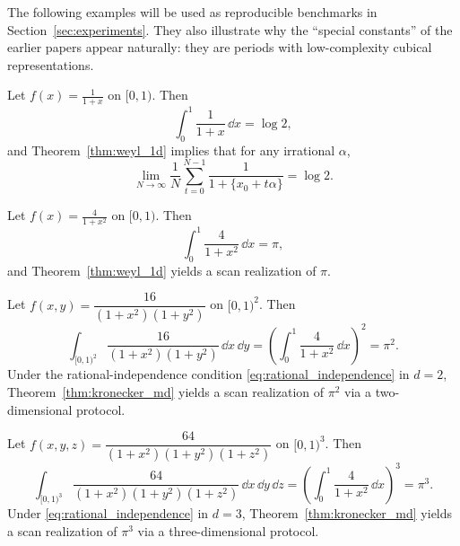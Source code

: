 The following examples will be used as reproducible benchmarks in Section~\ref{sec:experiments}. They also illustrate why the ``special constants'' of the earlier papers appear naturally: they are periods with low-complexity cubical representations.

\begin{example}
\label{ex:log2}
Let $f(x)=\frac{1}{1+x}$ on $[0,1)$. Then
\begin{equation}
\label{eq:log2_period}
\int_0^1 \frac{1}{1+x}\,\dd x = \log 2,
\end{equation}
and Theorem~\ref{thm:weyl_1d} implies that for any irrational $\alpha$,
\begin{equation}
\label{eq:log2_scan}
\lim_{N\to\infty}\frac{1}{N}\sum_{t=0}^{N-1}\frac{1}{1+\{x_0+t\alpha\}}=\log 2.
\end{equation}
\end{example}

\begin{example}
\label{ex:pi}
Let $f(x)=\frac{4}{1+x^2}$ on $[0,1)$. Then
\begin{equation}
\label{eq:pi_period}
\int_0^1 \frac{4}{1+x^2}\,\dd x = \pi,
\end{equation}
and Theorem~\ref{thm:weyl_1d} yields a scan realization of $\pi$.
\end{example}

\begin{example}
\label{ex:pi2}
Let $f(x,y)=\dfrac{16}{(1+x^2)(1+y^2)}$ on $[0,1)^2$. Then
\begin{equation}
\label{eq:pi2_period}
\int_{[0,1)^2} \frac{16}{(1+x^2)(1+y^2)}\,\dd x\,\dd y
=
\left(\int_0^1 \frac{4}{1+x^2}\,\dd x\right)^2
=\pi^2.
\end{equation}
Under the rational-independence condition \eqref{eq:rational_independence} in $d=2$, Theorem~\ref{thm:kronecker_md} yields a scan realization of $\pi^2$ via a two-dimensional protocol.
\end{example}

\begin{example}
\label{ex:pi3}
Let $f(x,y,z)=\dfrac{64}{(1+x^2)(1+y^2)(1+z^2)}$ on $[0,1)^3$. Then
\begin{equation}
\label{eq:pi3_period}
\int_{[0,1)^3} \frac{64}{(1+x^2)(1+y^2)(1+z^2)}\,\dd x\,\dd y\,\dd z
=
\left(\int_0^1 \frac{4}{1+x^2}\,\dd x\right)^3
=\pi^3.
\end{equation}
Under \eqref{eq:rational_independence} in $d=3$, Theorem~\ref{thm:kronecker_md} yields a scan realization of $\pi^3$ via a three-dimensional protocol.
\end{example}

